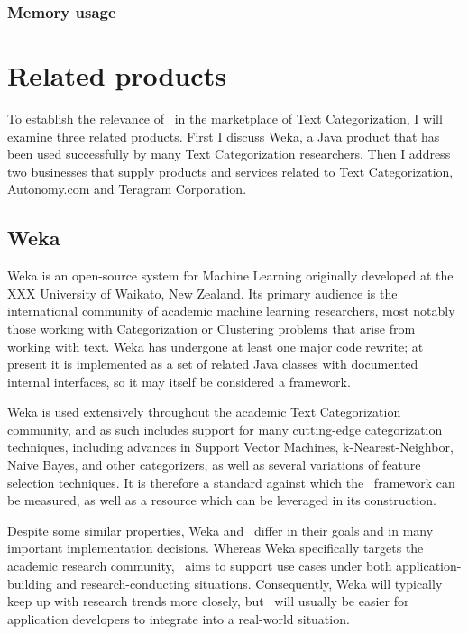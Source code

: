 \subsubsection{Memory usage}

\section{Related products}

To establish the relevance of \aicat\ in the marketplace of
Text Categorization, I will examine three related products.  First I
discuss Weka, a Java product that has been used successfully by many
Text Categorization researchers.  Then I address two businesses that
supply products and services related to Text Categorization,
Autonomy.com and Teragram Corporation.

\subsection{Weka}

Weka is an open-source system for Machine Learning originally
developed at the XXX University of Waikato, New Zealand.  Its primary
audience is the international community of academic machine learning
researchers, most notably those working with Categorization or
Clustering problems that arise from working with text.  Weka has
undergone at least one major code rewrite; at present it is
implemented as a set of related Java classes with documented internal
interfaces, so it may itself be considered a framework.

Weka is used extensively throughout the academic Text Categorization
community, and as such includes support for many cutting-edge
categorization techniques, including advances in Support Vector
Machines, k-Nearest-Neighbor, Naive Bayes, and other categorizers, as
well as several variations of feature selection techniques.  It is
therefore a standard against which the \aicat\ framework can
be measured, as well as a resource which can be leveraged in its
construction.

Despite some similar properties, Weka and \aicat\ differ in
their goals and in many important implementation decisions.  Whereas
Weka specifically targets the academic research community,
\aicat\ aims to support use cases under both
application-building and research-conducting situations.
Consequently, Weka will typically keep up with research trends more
closely, but \aicat\ will usually be easier for application
developers to integrate into a real-world situation.

